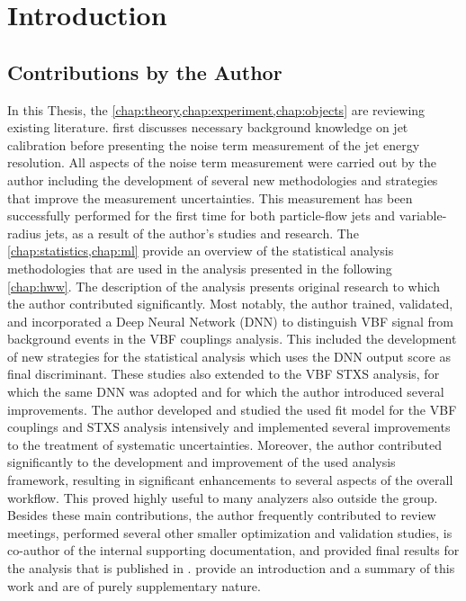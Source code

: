 \chapter{Introduction}
\label{chap:introduction}


\section{Contributions by the Author}
\label{sec:contributions}

In this Thesis, the \cref{chap:theory,chap:experiment,chap:objects} are reviewing existing literature.  first discusses necessary background knowledge on jet calibration before presenting the noise term measurement of the jet energy resolution. All aspects of the noise term measurement were carried out by the author including the development of several new methodologies and strategies that improve the measurement uncertainties. This measurement has been successfully performed for the first time for both particle-flow jets and variable-radius jets, as a result of the author's studies and research.
The \cref{chap:statistics,chap:ml} provide an overview of the statistical analysis methodologies that are used in the \HWW analysis presented in the following \cref{chap:hww}. The description of the \HWW analysis presents original research to which the author contributed significantly. 
Most notably, the author trained, validated, and incorporated a Deep Neural Network (DNN) to distinguish VBF signal from background events in the VBF couplings analysis. This included the development of new strategies for the statistical analysis which uses the DNN output score as final discriminant. These studies also extended to the VBF STXS analysis, for which the same DNN was adopted and for which the author introduced several improvements.
The author developed and studied the used fit model for the VBF couplings and STXS analysis intensively and implemented several improvements to the treatment of systematic uncertainties. 
Moreover, the author contributed significantly to the development and improvement of the used analysis framework, resulting in significant enhancements to several aspects of the overall workflow. This proved highly useful to many analyzers also outside the \HWW group. 
Besides these main contributions, the author frequently contributed to review meetings, performed several other smaller optimization and validation studies, is co-author of the internal supporting documentation, and provided final results for the analysis that is published in .
 provide an introduction and a summary of this work and are of purely supplementary nature.


